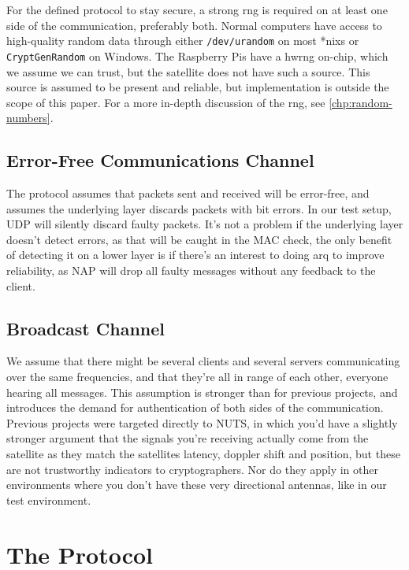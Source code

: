 For the defined protocol to stay secure, a strong \gls{rng} is required on at least one side of the communication, preferably both. Normal computers have access to high-quality random data through either \texttt{/dev/urandom} on most \glspl{*nix} or \texttt{CryptGenRandom} on Windows. The Raspberry Pis have a \gls{hwrng} on-chip, which we assume we can trust, but the satellite does not have such a source. This source is assumed to be present and reliable, but implementation is outside the scope of this paper. For a more in-depth discussion of the \gls{rng}, see \autoref{chp:random-numbers}.


    \subsection{Error-Free Communications Channel}

The protocol assumes that packets sent and received will be error-free, and assumes the underlying layer discards packets with bit errors. In our test setup, UDP will silently discard faulty packets. It's not a problem if the underlying layer doesn't detect errors, as that will be caught in the MAC check, the only benefit of detecting it on a lower layer is if there's an interest to doing \gls{arq} to improve reliability, as NAP will drop all faulty messages without any feedback to the client.


    \subsection{Broadcast Channel}

We assume that there might be several clients and several servers communicating over the same frequencies, and that they're all in range of each other, everyone hearing all messages. This assumption is stronger than for previous projects, and introduces the demand for authentication of both sides of the communication. Previous projects were targeted directly to NUTS, in which you'd have a slightly stronger argument that the signals you're receiving actually come from the satellite as they match the satellites latency, doppler shift and position, but these are not trustworthy indicators to cryptographers. Nor do they apply in other environments where you don't have these very directional antennas, like in our test environment.


\section{The Protocol}\label{sec:the_protocol}

